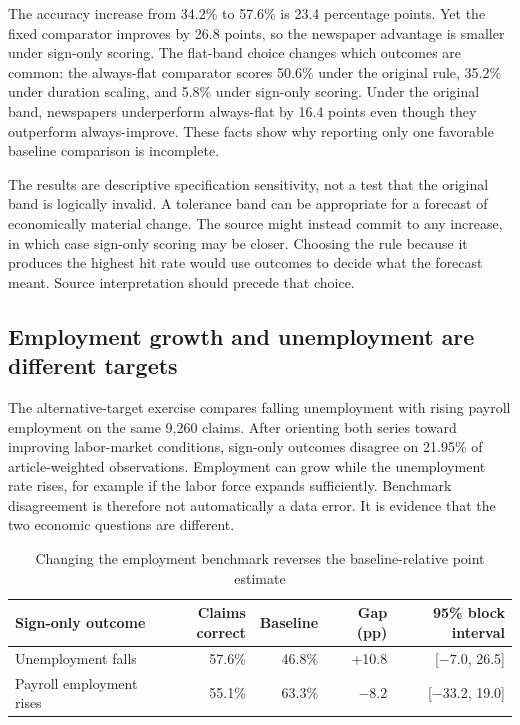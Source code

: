 The accuracy increase from 34.2\% to 57.6\% is 23.4 percentage points. Yet the fixed comparator improves by 26.8 points, so the newspaper advantage is smaller under sign-only scoring. The flat-band choice changes which outcomes are common: the always-flat comparator scores 50.6\% under the original rule, 35.2\% under duration scaling, and 5.8\% under sign-only scoring. Under the original band, newspapers underperform always-flat by 16.4 points even though they outperform always-improve. These facts show why reporting only one favorable baseline comparison is incomplete.

The results are descriptive specification sensitivity, not a test that the original band is logically invalid. A tolerance band can be appropriate for a forecast of economically material change. The source might instead commit to any increase, in which case sign-only scoring may be closer. Choosing the rule because it produces the highest hit rate would use outcomes to decide what the forecast meant. Source interpretation should precede that choice.

\subsection{Employment growth and unemployment are different targets}
The alternative-target exercise compares falling unemployment with rising payroll employment on the same 9,260 claims. After orienting both series toward improving labor-market conditions, sign-only outcomes disagree on 21.95\% of article-weighted observations. Employment can grow while the unemployment rate rises, for example if the labor force expands sufficiently. Benchmark disagreement is therefore not automatically a data error. It is evidence that the two economic questions are different.

\begin{table}[t]
\caption{Changing the employment benchmark reverses the baseline-relative point estimate}\label{tab:target}
\centering\small
\begin{tabularx}{\linewidth}{Xrrrr}
\toprule
Sign-only outcome & Claims correct & Baseline & Gap (pp) & 95\% block interval\\
\midrule
Unemployment falls & 57.6\% & 46.8\% & +10.8 & [$-7.0$, 26.5]\\
Payroll employment rises & 55.1\% & 63.3\% & $-8.2$ & [$-33.2$, 19.0]\\
\bottomrule
\end{tabularx}
\end{table}

